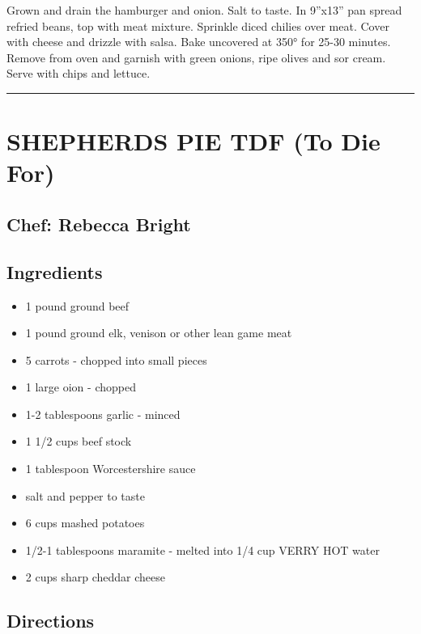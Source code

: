 \documentclass[
]{book}
\providecommand{\tightlist}{%
  \setlength{\itemsep}{0pt}\setlength{\parskip}{0pt}}
\begin{document}
Grown and drain the hamburger and onion. Salt to taste. In 9''x13'' pan spread refried beans,
top with meat mixture. Sprinkle diced chilies over meat. Cover with cheese and drizzle with salsa.
Bake uncovered at 350° for 25-30 minutes. Remove from oven and garnish with green onions, ripe olives
and sor cream. Serve with chips and lettuce.

\begin{center}\rule{0.5\linewidth}{0.5pt}\end{center}

\hypertarget{shepherds-pie-tdf-to-die-for}{%
\section*{SHEPHERDS PIE TDF (To Die For)}\label{shepherds-pie-tdf-to-die-for}}


\hypertarget{chef-rebecca-bright-3}{%
\subsection*{Chef: Rebecca Bright}\label{chef-rebecca-bright-3}}


\hypertarget{ingredients-68}{%
\subsection*{Ingredients}\label{ingredients-68}}


\begin{itemize}
\tightlist
\item
  1 pound ground beef
\item
  1 pound ground elk, venison or other lean game meat
\item
  5 carrots - chopped into small pieces
\item
  1 large oion - chopped
\item
  1-2 tablespoons garlic - minced
\item
  1 1/2 cups beef stock
\item
  1 tablespoon Worcestershire sauce
\item
  salt and pepper to taste
\item
  6 cups mashed potatoes
\item
  1/2-1 tablespoons maramite - melted into 1/4 cup VERRY HOT water
\item
  2 cups sharp cheddar cheese
\end{itemize}

\hypertarget{directions-68}{%
\subsection*{Directions}\label{directions-68}}
\end{document}

